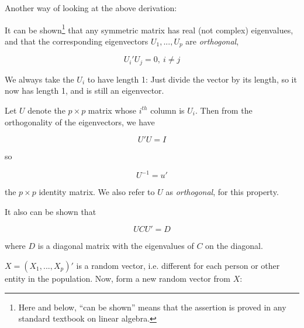 % 
% 

Another way of looking at the above derivation:

It can be shown\footnote{Here and below, ``can be shown'' means that the
assertion is proved in any standard textbook on linear algebra.} that
any symmetric matrix has real (not complex) eigenvalues, and that the
corresponding eigenvectors $U_1,...,U_p$ are \textit{orthogonal},

\begin{equation}
U_i' U_j = 0, ~ i \neq j
\end{equation}

We always take the $U_i$ to have length 1:  Just divide the vector by
its length, so it now has length 1, and is still an eigenvector.  

Let $U$ denote the $p \times p$ matrix whose $i^{th}$ column is $U_i$.
Then from the orthogonality of the eigenvectors, we have

\begin{equation}
\label{uui}
U'U = I
\end{equation}

so

\begin{equation}
U^{-1} = u'
\end{equation}

the $p \times p$ identity matrix.  We also refer to $U$ as
\emph{orthogonal}, for this property.

It also can be shown that 

\begin{equation}
U C U' = D
\end{equation}

where $D$ is a diagonal matrix with the eigenvalues of $C$ on the
diagonal.

% 


$X = (X_1,...,X_p)'$ is a random vector, i.e. different for each person
or other entity in the population.  Now, form a new random vector from
$X$:

